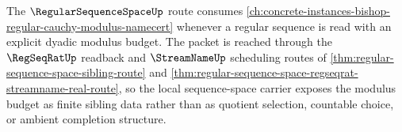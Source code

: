 The $\RegularSequenceSpaceUp$ route consumes \autoref{ch:concrete-instances-bishop-regular-cauchy-modulus-namecert} whenever a regular sequence is read with an explicit dyadic modulus budget. The packet is reached through the $\RegSeqRatUp$ readback and $\StreamNameUp$ scheduling routes of \autoref{thm:regular-sequence-space-sibling-route} and \autoref{thm:regular-sequence-space-regseqrat-streamname-real-route}, so the local sequence-space carrier exposes the modulus budget as finite sibling data rather than as quotient selection, countable choice, or ambient completion structure.
